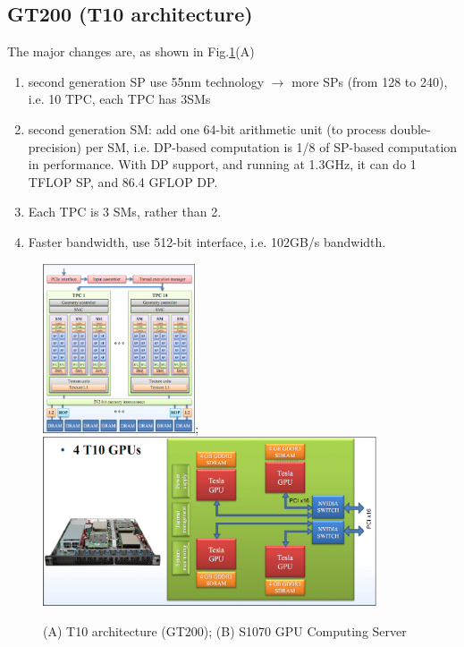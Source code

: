 \subsection{GT200 (T10 architecture)}
\label{sec:gt200-1}

The major changes are, as shown in Fig.\ref{fig:T10_arch}(A)
\begin{enumerate}
\item second generation SP use 55nm technology $\rightarrow$ more SPs
  (from 128 to 240), i.e. 10 TPC, each TPC has 3SMs

\item second generation SM: add one 64-bit arithmetic unit (to process
  double-precision) per SM, i.e. DP-based computation is 1/8 of
  SP-based computation in performance. With DP support, and running at 
  1.3GHz, it can do 1 TFLOP SP, and 86.4 GFLOP DP.
\item Each TPC is 3 SMs, rather than 2. 
\item Faster bandwidth, use 512-bit interface, i.e. 102GB/s bandwidth.

\end{enumerate}

\begin{figure}[hbt]
  \centerline{\includegraphics[height=5cm,
    angle=0]{./images/T10_Tesla.eps}; \includegraphics[height=5cm,
    angle=0]{./images/S1070.eps}}
\caption{(A) T10 architecture (GT200); (B) S1070 GPU Computing Server}
\label{fig:T10_arch}
\end{figure}

